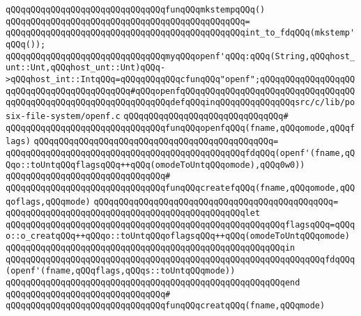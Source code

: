 \newline
\verb|qQQqqQQqqQQqqQQqqQQqqQQqqQQqqQQqfunqQQqmkstempqQQq()|\newline
\verb|qQQqqQQqqQQqqQQqqQQqqQQqqQQqqQQqqQQqqQQqqQQqqQQq=|\newline
\verb|qQQqqQQqqQQqqQQqqQQqqQQqqQQqqQQqqQQqqQQqqQQqqQQqint_to_fdqQQq(mkstemp'qQQq());|\newline
\newline
\newline
\verb|qQQqqQQqqQQqqQQqqQQqqQQqqQQqqQQqmyqQQqopenf'qQQq:qQQq(String,qQQqhost_unt::Unt,qQQqhost_unt::Unt)qQQq->qQQqhost_int::IntqQQq=qQQqqQQqqQQqcfunqQQq"openf";qQQqqQQqqQQqqQQqqQQqqQQqqQQqqQQqqQQqqQQqqQQq#qQQqopenfqQQqqQQqqQQqqQQqqQQqqQQqqQQqqQQqqQQqqQQqqQQqqQQqqQQqqQQqqQQqqQQqqQQqdefqQQqinqQQqqQQqqQQqqQQqsrc/c/lib/posix-file-system/openf.c|\newline
\verb|qQQqqQQqqQQqqQQqqQQqqQQqqQQqqQQq#|\newline
\verb|qQQqqQQqqQQqqQQqqQQqqQQqqQQqqQQqfunqQQqopenfqQQq(fname,qQQqomode,qQQqflags)|\newline
\verb|qQQqqQQqqQQqqQQqqQQqqQQqqQQqqQQqqQQqqQQqqQQqqQQq=|\newline
\verb|qQQqqQQqqQQqqQQqqQQqqQQqqQQqqQQqqQQqqQQqqQQqqQQqfdqQQq(openf'(fname,qQQqo::toUntqQQqflagsqQQq++qQQq(omodeToUntqQQqomode),qQQq0w0))|\newline
\verb|qQQqqQQqqQQqqQQqqQQqqQQqqQQqqQQq#|\newline
\verb|qQQqqQQqqQQqqQQqqQQqqQQqqQQqqQQqfunqQQqcreatefqQQq(fname,qQQqomode,qQQqoflags,qQQqmode)|\newline
\verb|qQQqqQQqqQQqqQQqqQQqqQQqqQQqqQQqqQQqqQQqqQQqqQQq=|\newline
\verb|qQQqqQQqqQQqqQQqqQQqqQQqqQQqqQQqqQQqqQQqqQQqqQQqlet|\newline
\verb|qQQqqQQqqQQqqQQqqQQqqQQqqQQqqQQqqQQqqQQqqQQqqQQqqQQqqQQqflagsqQQq=qQQqo::o_creatqQQq++qQQqo::toUntqQQqoflagsqQQq++qQQq(omodeToUntqQQqomode)|\newline
\verb|qQQqqQQqqQQqqQQqqQQqqQQqqQQqqQQqqQQqqQQqqQQqqQQqqQQqqQQqin|\newline
\verb|qQQqqQQqqQQqqQQqqQQqqQQqqQQqqQQqqQQqqQQqqQQqqQQqqQQqqQQqqQQqqQQqfdqQQq(openf'(fname,qQQqflags,qQQqs::toUntqQQqmode))|\newline
\verb|qQQqqQQqqQQqqQQqqQQqqQQqqQQqqQQqqQQqqQQqqQQqqQQqqQQqqQQqend|\newline
\verb|qQQqqQQqqQQqqQQqqQQqqQQqqQQqqQQq#|\newline
\verb|qQQqqQQqqQQqqQQqqQQqqQQqqQQqqQQqfunqQQqcreatqQQq(fname,qQQqmode)|\newline
